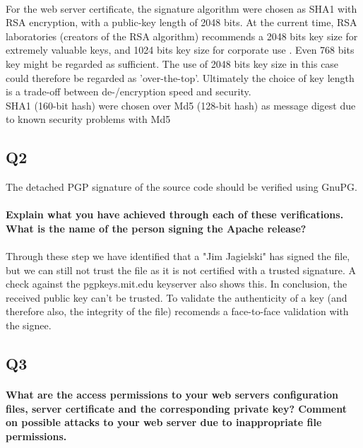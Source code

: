 \documentclass[a4paper,11pt]{article}
\begin{document}
\paragraph{} For the web server certificate, the signature algorithm were chosen as SHA1 with RSA encryption, with a public-key length of 2048 bits. At the current time, RSA laboratories (creators of the RSA algorithm) recommends a 2048 bits key size for extremely valuable keys, and 1024 bits key size for corporate use \cite{2}. Even 768 bits key might be regarded as sufficient. The use of 2048 bits key size in this case could therefore be regarded as 'over-the-top'. Ultimately the choice of key length is a trade-off between de-/encryption speed and security.\\
SHA1 (160-bit hash) were chosen over Md5 (128-bit hash) as message digest due to known security problems with Md5 \cite{3}
\subsection{Q2}
The detached PGP signature of the source code should be verified using GnuPG.
\paragraph{Explain what you have achieved through each of these veriﬁcations. What is the name of the person signing the Apache release?}
\paragraph{}Through these step we have identified that a "Jim Jagielski" has signed the file, but we can still not trust the file as it is not certified with a trusted signature. A check against the pgpkeys.mit.edu keyserver also shows this. In conclusion, the received public key can't be trusted. To validate the authenticity of a key (and therefore also, the integrity of the file) \cite{4} recomends a face-to-face validation with the signee. 
\subsection{Q3}
\paragraph{What are the access permissions to your web servers conﬁguration files, server certiﬁcate and the corresponding private key? Comment on possible attacks to your web server due to inappropriate file permissions.}
\end{document}
